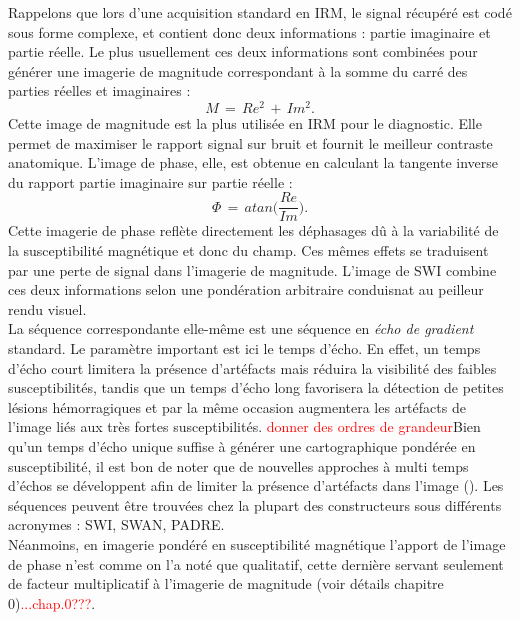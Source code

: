 Rappelons que lors d’une acquisition standard en IRM, le signal récupéré est codé sous forme complexe, et contient donc deux informations : partie imaginaire et partie réelle. Le plus usuellement ces deux informations sont combinées pour générer une imagerie de magnitude correspondant à la somme du carré des parties réelles et imaginaires :
\begin{equation}
M\,=\,Re^2\,+\,Im^2.
\end{equation}
Cette image de magnitude est la plus utilisée en IRM pour le diagnostic. Elle permet de maximiser le rapport signal sur bruit et fournit le meilleur contraste anatomique. L’image de phase, elle, est obtenue en calculant la tangente inverse du rapport partie imaginaire sur partie réelle :
\begin{equation}
\Phi\,=\,atan\biggl(\frac{Re}{Im}\biggr).
\end{equation}
Cette imagerie de phase reflète directement les déphasages dû à la variabilité de la susceptibilité magnétique et donc du champ. Ces mêmes effets se traduisent par une perte de signal dans l’imagerie de magnitude. L'image de SWI combine ces deux informations selon une pondération arbitraire conduisnat au peilleur rendu visuel. \\
La séquence correspondante elle-même est une séquence en {\em écho de gradient} standard. Le paramètre important est ici le temps d’écho. En effet, un temps d’écho court limitera la présence d’artéfacts mais réduira la visibilité des faibles susceptibilités, tandis que un temps d’écho long favorisera la détection de petites lésions hémorragiques et par la même occasion augmentera les artéfacts de l’image liés aux très fortes susceptibilités. \textcolor{red}{ donner des ordres de grandeur}Bien qu’un temps d’écho unique suffise à générer une cartographique pondérée en susceptibilité, il est bon de noter que de nouvelles approches à multi temps d’échos se développent afin de limiter la présence d’artéfacts dans l’image (\cite{Oh2013}). Les séquences peuvent être trouvées chez la plupart des constructeurs sous différents acronymes : SWI, SWAN, PADRE.\\
Néanmoins, en imagerie pondéré en susceptibilité magnétique l’apport de l’image de phase n’est comme on l'a noté que qualitatif, cette dernière servant seulement de facteur multiplicatif à l’imagerie de magnitude (voir détails chapitre 0)\textcolor{red}{...chap.0???}.\\
